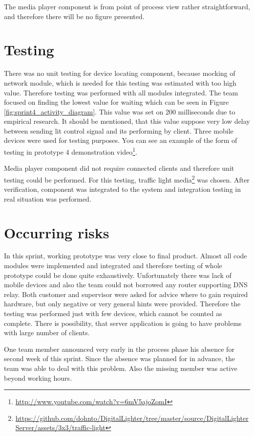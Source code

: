 The media player component is from point of process view rather straightforward, and therefore there will be no figure presented.

\section{Testing}
There was no unit testing for device locating component, because mocking of network module, which is needed for this testing was estimated with too high value.
Therefore testing was performed with all modules integrated.
The team focused on finding the lowest value for waiting which can be seen in Figure \ref{fig:sprint4_activity_diagram}.
This value was set on 200 milliseconds due to empirical research.
It should be mentioned, that this value suppose very low delay between sending lit control signal and its performing by client.
Three mobile devices were used for testing purposes.
You can see an example of the form of testing in prototype 4 demonstration video\footnote{\url{http://www.youtube.com/watch?v=6mV5ajoZomI}}.

Media player component did not require connected clients and therefore unit testing could be performed.
For this testing, traffic light media\footnote{\url{https://github.com/dohnto/DigitalLighter/tree/master/source/DigitalLighterServer/assets/3x3/traffic-light}} was chosen.
After verification, component was integrated to the system and integration testing in real situation was performed.

\section{Occurring risks}
In this sprint, working prototype was very close to final product.
Almost all code modules were implemented and integrated and therefore testing of whole prototype could be done quite exhaustively.
Unfortunately there was lack of mobile devices and also the team could not borrowed any router supporting DNS relay.
Both customer and supervisor were asked for advice where to gain required hardware, but only negative or very general hints were provided.
Therefore the testing was performed just with few devices, which cannot be counted as complete.
There is possibility, that server application is going to have problems with large number of clients.

One team member announced very early in the process phase his absence for second week of this sprint.
Since the absence was planned for in advance, the team was able to deal with this problem.
Also the missing member was active beyond working hours.

